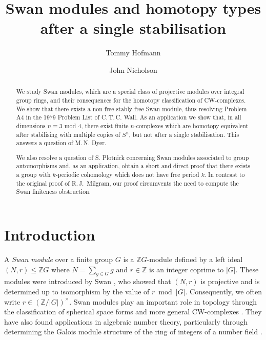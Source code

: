 \documentclass[11pt,leqno,a4paper]{amsart}
\newcommand{\Z}{\mathbb{Z}}
\theoremstyle{definition}
\theoremstyle{remark}
\theoremstyle{custom}
\begin{document}
\title{Swan modules and homotopy types after a single stabilisation}

\author{Tommy Hofmann} 
\address{Naturwissenschaftlich-Technische Fakult\"{a}t, Universit\"{a}t Siegen,  Walter-Flex-Strasse \newline {}, 57068 Siegen, Germany}

\author{John Nicholson}
\address{School of Mathematics and Statistics, University of Glasgow, United Kingdom}



\begin{abstract}
We study Swan modules, which are a special class of projective modules over integral group rings, and their consequences for the homotopy classification of CW-complexes.
We show that there exists a non-free stably free Swan module, thus resolving Problem A4 in the 1979 Problem List of C.\,T.\,C. Wall.
As an application we show that, in all dimensions $n \equiv 3$ mod $4$, there exist finite $n$-complexes which are homotopy equivalent after stabilising with multiple copies of $S^n$, but not after a single stabilisation. This answers a question of M.\,N. Dyer. 

We also resolve a question of S. Plotnick concerning Swan modules associated to group automorphisms and, as an application, obtain a short and direct proof that there exists a group with $k$-periodic cohomology which does not have free period $k$.
In contrast to the original proof of R.\,J.~Milgram, our proof circumvents the need to compute the Swan finiteness obstruction.
\end{abstract}

\maketitle

\vspace{-5mm}

\section{Introduction}

A \textit{Swan module} over a finite group $G$ is a $\Z G$-module
defined by a left ideal $(N,r) \le \Z G$ where $N = \sum_{g \in G} g$ and $r \in \Z$ is an integer coprime to $|G|$. 
These modules were introduced by Swan \cite{Sw60-II}, who showed that $(N,r)$ is projective and is determined up to isomorphism by the value of $r \bmod |G|$. Consequently, we often write $r \in (\Z/|G|)^\times$.
Swan modules play an important role in topology through the classification of spherical space forms \cite{Sw60,TW71,LT73} and more general CW-complexes \cite{Jo03a, Ni20b, Ni20a}.
They have also found applications in algebraic number theory, particularly through determining the Galois module structure of the ring of integers of a number field \cite{Ta81,Ta84,GRRS99}.
\end{document}
